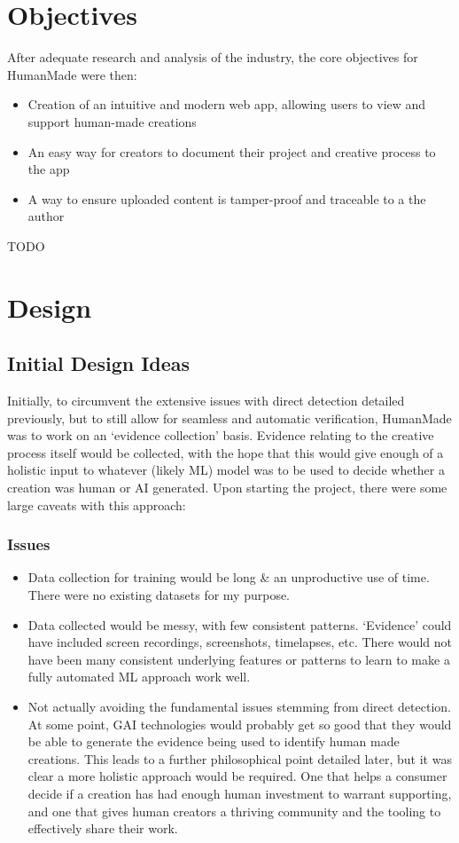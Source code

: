 \documentclass[12pt,a4paper]{article}
\begin{document}
\section{Objectives}
After adequate research and analysis of the industry, the core objectives for HumanMade were then:
\begin{itemize}
    \item Creation of an intuitive and modern web app, allowing users to view and support human-made creations
    \item An easy way for creators to document their project and creative process to the app
    \item A way to ensure uploaded content is tamper-proof and traceable to a the author
\end{itemize}
TODO
\section{Design}
\subsection{Initial Design Ideas}
Initially, to circumvent the extensive issues with direct detection detailed previously, but to still allow for seamless and automatic verification, HumanMade was to work on an `evidence collection' basis. Evidence relating to the creative process itself would be collected, with the hope that this would give enough of a holistic input to whatever (likely ML) model was to be used to decide whether a creation was human or AI generated. Upon starting the project, there were some large caveats with this approach:
\subsubsection{Issues}
\begin{itemize}
    \item Data collection for training would be long \& an unproductive use of time. There were no existing datasets for my purpose.
    \item Data collected would be messy, with few consistent patterns. `Evidence' could have included screen recordings, screenshots, timelapses, etc. There would not have been many consistent underlying features or patterns to learn to make a fully automated ML approach work well.
    \item Not actually avoiding the fundamental issues stemming from direct detection. At some point, GAI technologies would probably get so good that they would be able to generate the evidence being used to identify human made creations. This leads to a further philosophical point detailed later, but it was clear a more holistic approach would be required. One that helps a consumer decide if a creation has had enough human investment to warrant supporting, and one that gives human creators a thriving community and the tooling to effectively share their work.
\end{itemize}
\end{document}
